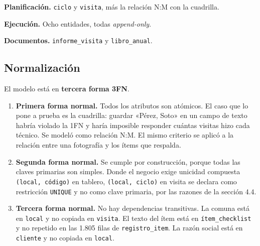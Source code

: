 \documentclass[10pt,letterpaper]{article}
\begin{document}
\textbf{Planificación.} \texttt{ciclo} y \texttt{visita}, más la relación N:M
con la cuadrilla.

\textbf{Ejecución.} Ocho entidades, todas \emph{append-only}.

\textbf{Documentos.} \texttt{informe\_visita} y \texttt{libro\_anual}.

\subsection{Normalización}

El modelo está en \textbf{tercera forma  3FN}.
\begin{enumerate}
\item \textbf{Primera forma normal.} Todos los atributos son atómicos. El caso que lo
pone a prueba es la cuadrilla: guardar «Pérez, Soto» en un campo de texto
habría violado la 1FN y haría imposible responder cuántas visitas hizo cada
técnico. Se modeló como relación N:M. El mismo criterio se aplicó a la relación
entre una fotografía y los ítems que respalda.

 \item  \textbf{Segunda forma normal.} Se cumple por construcción, porque todas las
claves primarias son simples. Donde el negocio exige unicidad compuesta
\texttt{(local, código)} en tablero, \texttt{(local, ciclo)} en visita se
declara como restricción \texttt{UNIQUE} y no como clave primaria, por las
razones de la sección 4.4.

 \item \textbf{Tercera forma normal.} No hay dependencias transitivas. La comuna está
en \texttt{local} y no copiada en \texttt{visita}. El texto del ítem está en
\texttt{ítem\_checklist} y no repetido en las 1.805 filas de
\texttt{registro\_item}. La razón social está en \texttt{cliente} y no copiada
en \texttt{local}.
\end{enumerate}
\end{document}
